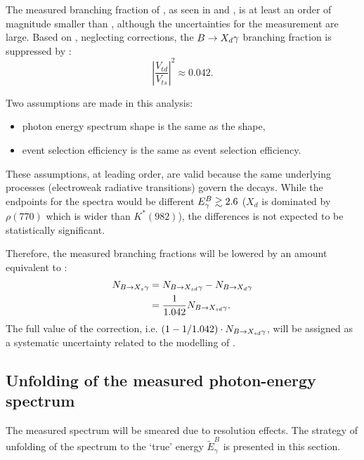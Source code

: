 The measured branching fraction of \BtoXdgamma, 
as seen in  and , is at least an order of magnitude smaller than \BtoXsgamma,
although the uncertainties for the measurement are large.
Based on , neglecting corrections, the $\BtoXdgamma$ branching fraction
is suppressed by \cite{Workman:2022ynf}:
\begin{equation}\label{eq:btodgamma_suppression}
    \left|\frac{V_{td}}{V_{ts}}\right|^2 \approx 0.042.
\end{equation}

Two assumptions are made in this analysis:
\begin{itemize}
    \item \BtoXdgamma photon energy spectrum shape is the same as the \BtoXsgamma shape,
    \item \BtoXdgamma event selection efficiency is the same as \BtoXsgamma event selection efficiency.
\end{itemize}
These assumptions, at leading order, are valid because the same underlying processes (electroweak radiative transitions) govern the decays.
While the endpoints for the spectra would be different ${E^B_{\gamma}}\gtrsim2.6$ ($X_d$ is dominated by $\rho(770)$ 
which is wider than $K^*(982)$), the differences is not expected to be statistically significant.

Therefore, the measured \BtoXsdgamma branching fractions will be lowered by an amount equivalent to :
\begin{align}
    \begin{split}
    N_{\BtoXsgamma} &= N_{\BtoXsdgamma} - N_{\BtoXdgamma}\\
                    &=\frac{1}{1.042} N_{\BtoXsdgamma}.
    \end{split}
\end{align}
The full value of the correction, i.e. $(1-1/1.042) \cdot N_{\BtoXsdgamma}$, will be assigned as a systematic uncertainty related to the modelling of \BtoXdgamma.

\subsection{Unfolding of the measured photon-energy spectrum} \label{sec:signal_unfolding}

The measured \EB spectrum will be smeared due to resolution effects.
The strategy of unfolding of the \EB spectrum to the `true' energy $\tilde{E}_{\gamma}^B$ is presented in this section.
